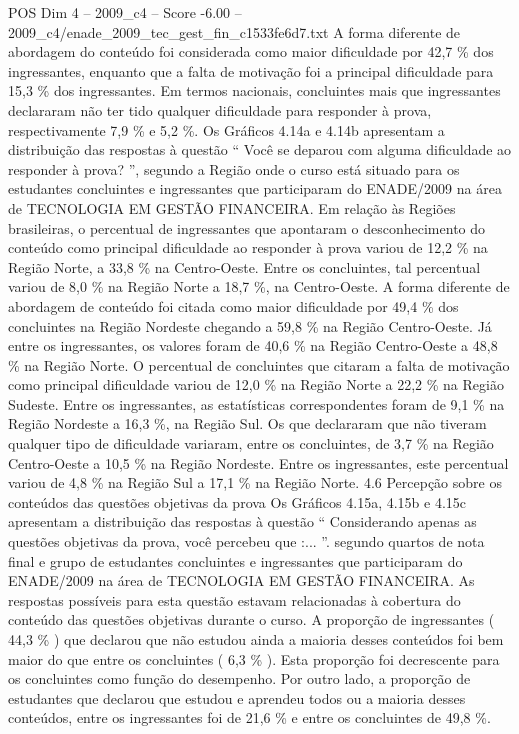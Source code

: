 \begin{textsample}{POS Dim 4 – 2009\_c4 – Score -6.00 – 2009\_c4/enade\_2009\_tec\_gest\_fin\_c1533fe6d7.txt}
A forma diferente de abordagem do conteúdo foi considerada como maior dificuldade por 42,7 \% dos ingressantes, enquanto que a falta de motivação foi a principal dificuldade para 15,3 \% dos ingressantes.
Em termos nacionais, concluintes mais que ingressantes declararam não ter tido qualquer dificuldade para responder à prova, respectivamente 7,9 \% e 5,2 \%.
Os Gráficos 4.14a e 4.14b apresentam a distribuição das respostas à questão “ Você se deparou com alguma dificuldade ao responder à prova? ”, segundo a Região onde o curso está situado para os estudantes concluintes e ingressantes que participaram do ENADE/2009 na área de TECNOLOGIA EM GESTÃO FINANCEIRA.
Em relação às Regiões brasileiras, o percentual de ingressantes que apontaram o desconhecimento do conteúdo como principal dificuldade ao responder à prova variou de 12,2 \% na Região Norte, a 33,8 \% na Centro-Oeste.
Entre os concluintes, tal percentual variou de 8,0 \% na Região Norte a 18,7 \%, na Centro-Oeste.
A forma diferente de abordagem de conteúdo foi citada como maior dificuldade por 49,4 \% dos concluintes na Região Nordeste chegando a 59,8 \% na Região Centro-Oeste.
Já entre os ingressantes, os valores foram de 40,6 \% na Região Centro-Oeste a 48,8 \% na Região Norte.
O percentual de concluintes que citaram a falta de motivação como principal dificuldade variou de 12,0 \% na Região Norte a 22,2 \% na Região Sudeste.
Entre os ingressantes, as estatísticas correspondentes foram de 9,1 \% na Região Nordeste a 16,3 \%, na Região Sul.
Os que declararam que não tiveram qualquer tipo de dificuldade variaram, entre os concluintes, de 3,7 \% na Região Centro-Oeste a 10,5 \% na Região Nordeste.
Entre os ingressantes, este percentual variou de 4,8 \% na Região Sul a 17,1 \% na Região Norte. 4.6 Percepção sobre os conteúdos das questões objetivas da prova Os Gráficos 4.15a, 4.15b e 4.15c apresentam a distribuição das respostas à questão “ Considerando apenas as questões objetivas da prova, você percebeu que :... ”. segundo quartos de nota final e grupo de estudantes concluintes e ingressantes que participaram do ENADE/2009 na área de TECNOLOGIA EM GESTÃO FINANCEIRA.
As respostas possíveis para esta questão estavam relacionadas à cobertura do conteúdo das questões objetivas durante o curso.
A proporção de ingressantes ( 44,3 \% ) que declarou que não estudou ainda a maioria desses conteúdos foi bem maior do que entre os concluintes ( 6,3 \% ).
Esta proporção foi decrescente para os concluintes como função do desempenho.
Por outro lado, a proporção de estudantes que declarou que estudou e aprendeu todos ou a maioria desses conteúdos, entre os ingressantes foi de 21,6 \% e entre os concluintes de 49,8 \%.

\end{textsample}
